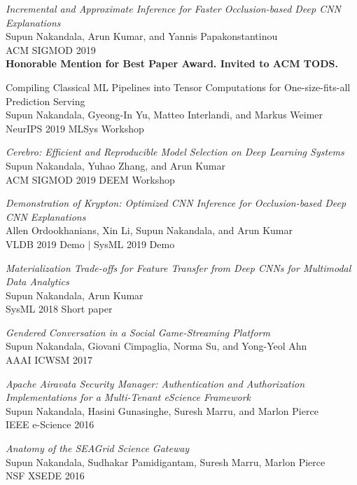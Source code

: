 \documentclass[margin]{res}
\begin{document}
\begin{resume}
\par
\textit{Incremental and Approximate Inference for Faster Occlusion-based Deep CNN Explanations} \\
Supun Nakandala, Arun Kumar, and Yannis Papakonstantinou \\
ACM SIGMOD 2019 \\
\textbf{Honorable Mention for Best Paper Award. Invited to ACM TODS.}

\par
Compiling Classical ML Pipelines into Tensor Computations for One-size-fits-all Prediction Serving \\
Supun Nakandala, Gyeong-In Yu, Matteo Interlandi, and Markus Weimer\\
NeurIPS 2019 MLSys Workshop

\par
\textit{Cerebro: Efficient and Reproducible Model Selection on Deep Learning Systems} \\
Supun Nakandala, Yuhao Zhang, and Arun Kumar\\
ACM SIGMOD 2019 DEEM Workshop

\par
\textit{Demonstration of Krypton: Optimized CNN Inference for Occlusion-based Deep CNN Explanations} \\
Allen Ordookhanians, Xin Li, Supun Nakandala, and Arun Kumar\\
VLDB 2019 Demo $|$ SysML 2019 Demo

\par
\textit{Materialization Trade-offs for Feature Transfer from Deep CNNs for Multimodal Data Analytics} \\
Supun Nakandala, Arun Kumar\\
SysML 2018 Short paper

\par
\textit{Gendered Conversation in a Social Game-Streaming Platform} \\
Supun Nakandala, Giovani Cimpaglia, Norma Su, and Yong-Yeol Ahn \\
AAAI ICWSM 2017

\par
\textit{Apache Airavata Security Manager: Authentication and Authorization Implementations for a Multi-Tenant eScience Framework
} \\
Supun Nakandala, Hasini Gunasinghe, Suresh Marru, and Marlon Pierce\\
IEEE e-Science 2016\\

\par
\textit{Anatomy of the SEAGrid Science Gateway} \\
Supun Nakandala, Sudhakar Pamidigantam, Suresh Marru, Marlon Pierce\\
NSF XSEDE 2016



\end{resume}
\end{document}
